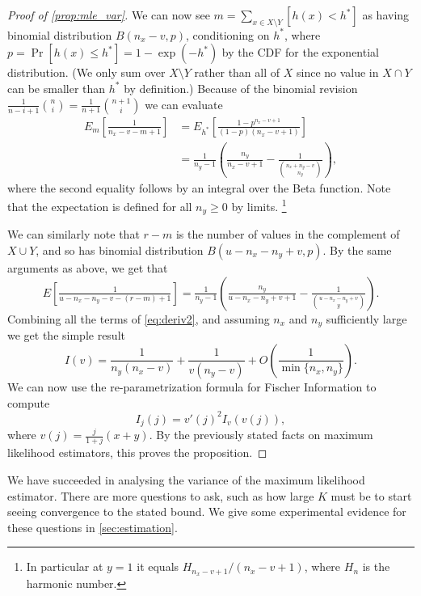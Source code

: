 \begin{proof}[Proof of \cref{prop:mle_var}]
   We can now see $m=\sum_{x\in X\setminus Y} [h(x) < h^*]$ as having binomial distribution $B(n_x-v, p)$, conditioning on $h^*$, where $p=\Pr[h(x)\le h^*] = 1-\exp(-h^*)$ by the CDF for the exponential distribution.
   (We only sum over $X\setminus Y$ rather than all of $X$ since no value in $X\cap Y$ can be smaller than $h^*$ by definition.)
   Because of the binomial revision
   $\frac1{n-i+1}\binom{n}{i} = \frac1{n+1}\binom{n+1}{i}$
   we can evaluate
   \begin{align}
      E_m\left[\tfrac1{n_x-v-m+1}\right]
      &= E_{h^*}\left[\tfrac{1-p^{n_x-v+1}}{(1-p)(n_x-v+1)}\right]
    \\&= \tfrac1{n_y-1}\left(\tfrac{n_y}{n_x-v+1} - \tfrac1{\binom{n_x+n_y-v}{n_y}}\right),
   \end{align}
   where the second equality follows by an integral over the Beta function.
   Note that the expectation is defined for all $n_y\ge 0$ by limits.%
   \footnote{In particular at $y=1$ it equals $H_{n_x-v+1}/(n_x-v+1)$, where $H_n$ is the harmonic number.}

   We can similarly note that $r-m$ is the number of values in the complement of $X\cup Y$, and so has binomial distribution $B(u-n_x-n_y+v, p)$.
   By the same arguments as above, we get that
   \[
      E\left[\tfrac1{u-n_x-n_y-v-(r-m)+1}\right]
      = \tfrac1{n_y-1}\left(\tfrac{n_y}{u-n_x-n_y+v+1} - \tfrac1{\binom{u-n_x-n_y+v}{y}}\right).
   \]
   Combining all the terms of \cref{eq:deriv2}, and assuming $n_x$ and $n_y$ sufficiently large we get the simple result
   \[
   I(v)
   = \frac{1}{n_y(n_x-v)} + \frac1{v(n_y-v)} + O\left( \frac{1}{\min\{n_x,n_y\}} \right).
   \]
   We can now use the re-parametrization formula for Fischer Information to compute
   \[
      I_j(j) = v'(j)^{2}I_v(v(j)),
   \]
   where $v(j) = \frac{j}{1+j}(x+y)$.
   By the previously stated facts on maximum likelihood estimators, this proves the proposition.
\end{proof}

We have succeeded in analysing the variance of the maximum likelihood estimator.
There are more questions to ask, such as how large $K$ must be to start seeing convergence to the stated bound.
We give some experimental evidence for these questions in \cref{sec:estimation}.

